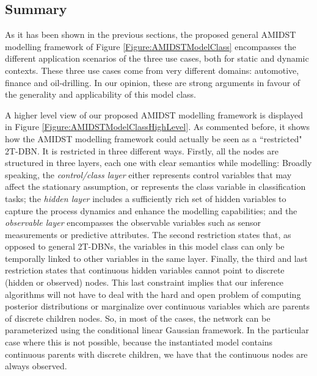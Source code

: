\subsection{Summary}\label{summaryAMIDSTModels}

As it has been shown in the previous sections, the proposed general AMIDST modelling framework of Figure \ref{Figure:AMIDSTModelClass} encompasses the different application scenarios of the three use cases, both for static and dynamic contexts. These three use cases come from very different domains: automotive, finance and oil-drilling. In our opinion, these are strong arguments in favour of the generality and applicability of this model class. 

A higher level view of our proposed AMIDST modelling framework is displayed in Figure
\ref{Figure:AMIDSTModelClassHighLevel}. As commented before, it shows how the AMIDST modelling framework could actually
be seen as a ``restricted" 2T-DBN. It is restricted in three different ways. Firstly, all the nodes are structured in
three layers, each one with clear semantics while modelling: Broadly speaking, the \textit{control/class layer} either
represents control variables that may affect the stationary assumption, or represents the class variable in
classification tasks; the \textit{hidden layer} includes a sufficiently rich set of hidden variables to capture the
process dynamics and enhance the modelling capabilities; and the \textit{observable layer} encompasses the observable
variables such as sensor measurements or predictive attributes. The second restriction states that, as opposed to
general 2T-DBNs, the variables in this model class can only be temporally linked to other variables in the same
layer. Finally, the third and last restriction  states that continuous hidden variables cannot point to discrete (hidden
or observed) nodes. This last constraint implies that our inference algorithms will not have to deal with the hard and
open problem of computing posterior distributions or marginalize over continuous variables which are parents of discrete
children nodes. So, in most of the cases, the network can be parameterized using the conditional linear Gaussian
framework. In the particular case where this is not possible, because the instantiated model contains continuous parents
with discrete children, we have that the continuous nodes are always observed. 

